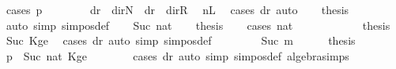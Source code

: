 \begin{isabellebody}
%
\isadelimproof
%
\endisadelimproof
%
\isatagproof
{}\isamarkupfalse%
\ {\isacharparenleft}{\kern0pt}cases\ p{\isacharparenright}{\kern0pt}\isanewline
\ \ \isamarkupfalse%
\ {}\isanewline
\ \ \isamarkupfalse%
\ {\isachardoublequoteopen}dr\ {\isacharequal}{\kern0pt}\ dir{\isachardot}{\kern0pt}N\ {\isasymor}\ dr\ {\isacharequal}{\kern0pt}\ dir{\isachardot}{\kern0pt}R{\isachardoublequoteclose}\ \isamarkupfalse%
\ nL{}\ \isamarkupfalse%
\ {\isacharparenleft}{\kern0pt}cases\ dr{\isacharparenright}{\kern0pt}\ auto\isanewline
\ \ \isamarkupfalse%
\ {\isacharquery}{\kern0pt}thesis\ \isamarkupfalse%
\ {}\ \isamarkupfalse%
\ {\isacharparenleft}{\kern0pt}auto\ simp{\isacharcolon}{\kern0pt}\ sim{\isacharunderscore}{\kern0pt}pos{\isacharunderscore}{\kern0pt}def{\isacharparenright}{\kern0pt}\isanewline
{}\isamarkupfalse%
\isanewline
\ \ \isamarkupfalse%
\ {\isacharparenleft}{\kern0pt}Suc\ nat{\isacharparenright}{\kern0pt}\isanewline
\ \ \isamarkupfalse%
\ {\isacharquery}{\kern0pt}thesis\isanewline
\ \ \isamarkupfalse%
\ {\isacharparenleft}{\kern0pt}cases\ nat{\isacharparenright}{\kern0pt}\isanewline
\ \ \ \ \isamarkupfalse%
\ {}\isanewline
\ \ \ \ \isamarkupfalse%
\ {\isacharquery}{\kern0pt}thesis\ \isamarkupfalse%
\ Suc\ Kge{}\ \isamarkupfalse%
\ {\isacharparenleft}{\kern0pt}cases\ dr{\isacharparenright}{\kern0pt}\ {\isacharparenleft}{\kern0pt}auto\ simp{\isacharcolon}{\kern0pt}\ sim{\isacharunderscore}{\kern0pt}pos{\isacharunderscore}{\kern0pt}def{\isacharparenright}{\kern0pt}\isanewline
\ \ \isamarkupfalse%
\isanewline
\ \ \ \ \isamarkupfalse%
\ {\isacharparenleft}{\kern0pt}Suc\ m{\isacharparenright}{\kern0pt}\isanewline
\ \ \ \ \isamarkupfalse%
\ {\isacharquery}{\kern0pt}thesis\ \isamarkupfalse%
\ {\isacartoucheopen}p\ {\isacharequal}{\kern0pt}\ Suc\ nat{\isacartoucheclose}\ Kge{}\isanewline
\ \ \ \ \ \ \isamarkupfalse%
\ {\isacharparenleft}{\kern0pt}cases\ dr{\isacharparenright}{\kern0pt}\ {\isacharparenleft}{\kern0pt}auto\ simp{\isacharcolon}{\kern0pt}\ sim{\isacharunderscore}{\kern0pt}pos{\isacharunderscore}{\kern0pt}def\ algebra{\isacharunderscore}{\kern0pt}simps{\isacharparenright}{\kern0pt}\isanewline

\end{isabellebody}

